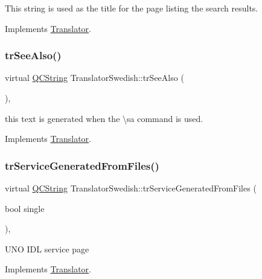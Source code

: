This string is used as the title for the page listing the search results. 

Implements \mbox{\hyperlink{class_translator}{Translator}}.

\mbox{\label{class_translator_swedish_a4e31e1a45f5fe7385027d3a94da013ee}} 
\subsubsection{\texorpdfstring{trSeeAlso()}{trSeeAlso()}}
{\footnotesize\ttfamily virtual \mbox{\hyperlink{class_q_c_string}{Q\+C\+String}} Translator\+Swedish\+::tr\+See\+Also (\begin{DoxyParamCaption}{ }\end{DoxyParamCaption})\hspace{0.3cm}{\ttfamily [inline]}, {\ttfamily [virtual]}}

this text is generated when the \textbackslash{}sa command is used. 

Implements \mbox{\hyperlink{class_translator}{Translator}}.

\mbox{\label{class_translator_swedish_a5de92d2f24e2ed5347ae5e9802089c19}} 
\subsubsection{\texorpdfstring{trServiceGeneratedFromFiles()}{trServiceGeneratedFromFiles()}}
{\footnotesize\ttfamily virtual \mbox{\hyperlink{class_q_c_string}{Q\+C\+String}} Translator\+Swedish\+::tr\+Service\+Generated\+From\+Files (\begin{DoxyParamCaption}\item[{bool}]{single }\end{DoxyParamCaption})\hspace{0.3cm}{\ttfamily [inline]}, {\ttfamily [virtual]}}

U\+NO I\+DL service page 

Implements \mbox{\hyperlink{class_translator}{Translator}}.

\mbox{\label{class_translator_swedish_ab276b047a9aff033a05abfe3f1073cae}} 
